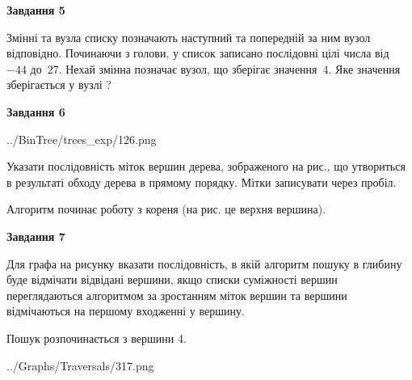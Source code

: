 \documentclass[12pt, ukrainian]{article}
\begin{document}
{\begin {large}
{\begin {center}\textbf{Завдання 5}\end {center}}\par
Змінні  та  вузла списку позначають наступний та попередній за ним вузол відповідно. Починаючи з голови, у список записано послідовні цілі числа від~$-44$ до~$27$. Нехай змінна  позначає вузол, що зберігає значення~$4$.
Яке значення зберігається у вузлі  ?\par
\newpage

{\begin {center}\textbf{Завдання 6}\end {center}}\par

\begin{center}
	{../BinTree/trees_exp/126.png}
\end{center}
Указати послідовність міток вершин дерева, зображеного на рис., що утвориться в результаті обходу дерева в прямому порядку. Мітки записувати через пробіл.\par Алгоритм починає роботу з кореня (на рис. це верхня вершина).\par
\newpage

{\begin {center}\textbf{Завдання 7}\end {center}}\par
Для графа на рисунку вказати послідовність, в якій алгоритм пошуку в глибину буде відмічати відвідані вершини, якщо списки суміжності вершин переглядаються алгоритмом за зростанням міток вершин та вершини відмічаються на першому вход\-женні у вершину.\par
Пошук розпочинається з вершини 4.\par

\begin{center}
	{../Graphs/Traversals/317.png}
\end{center}\par
\newpage


\end{large}}
\end{document}
